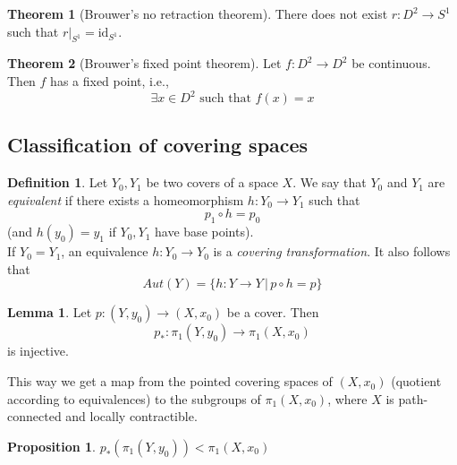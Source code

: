 \documentclass[a4paper,14pt]{extarticle}
\theoremstyle{definition}
\newtheorem*{theorem}{Theorem}
\newtheorem*{definition}{Definition}
\newtheorem*{lemma}{Lemma}
\newtheorem*{proposition}{Proposition}
\begin{document}
\begin{theorem}[Brouwer's no retraction theorem]
  There does not exist $r:D^2\rightarrow S^1$ such that $r|_{S^1}=\text{id}_{S^1}$.
\end{theorem}

\begin{theorem}[Brouwer's fixed point theorem]
  Let $f:D^2\rightarrow D^2$ be continuous. Then $f$ has a fixed point, i.e.,
  \[\exists x\in D^2\text{ such that }f(x)=x\]
\end{theorem}

\subsection{Classification of covering spaces}
\begin{definition}
  Let $Y_0, Y_1$ be two covers of a space $X$. We say that $Y_0$ and $Y_1$ are \textit{equivalent} if there exists a homeomorphism $h:Y_0\rightarrow Y_1$ such that 
  \[p_1\circ h=p_0\] (and $h(y_0)=y_1$ if $Y_0, Y_1$ have base points). \\

  If $Y_0=Y_1$, an equivalence $h:Y_0\rightarrow Y_0$ is a \textit{covering transformation}.
  It also follows that 
  \[Aut(Y)=\{h:Y\rightarrow Y \,|\, p\circ h=p\}\]
\end{definition}

\begin{lemma}
  Let $p:(Y,y_0)\rightarrow(X,x_0)$ be a cover. Then 
  \[p_*:\pi_1(Y,y_0)\rightarrow\pi_1(X,x_0)\]
  is injective.
\end{lemma}
This way we get a map from the pointed covering spaces of $(X,x_0)$ (quotient according 
to equivalences) to the subgroups of $\pi_1(X,x_0)$, where $X$ is path-connected and 
locally contractible.

\begin{proposition}
  $p_*(\pi_1(Y,y_0))<\pi_1(X,x_0)$
\end{proposition}
\end{document}
